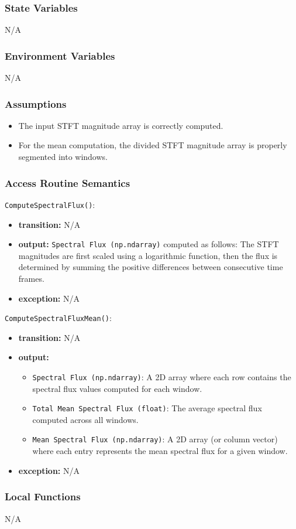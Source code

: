 \documentclass[12pt, titlepage]{article}
\begin{document}
{\subsubsection{State Variables}
N/A

\subsubsection{Environment Variables}
N/A

\subsubsection{Assumptions}
\begin{itemize}
    \item The input STFT magnitude array is correctly computed.
    \item For the mean computation, the divided STFT magnitude array is properly segmented into windows.
\end{itemize}

\subsubsection{Access Routine Semantics}

\noindent \texttt{ComputeSpectralFlux()}:
\begin{itemize}
    \item \textbf{transition:} N/A
    \item \textbf{output:} \texttt{Spectral Flux (np.ndarray)} computed as follows: The STFT magnitudes are first scaled using a logarithmic function, then the flux is determined by summing the positive differences between consecutive time frames.
    \item \textbf{exception:} N/A
\end{itemize}

\noindent \texttt{ComputeSpectralFluxMean()}:
\begin{itemize}
    \item \textbf{transition:} N/A
    \item \textbf{output:} 
    \begin{itemize}
        \item \texttt{Spectral Flux (np.ndarray)}: A 2D array where each row contains the spectral flux values computed for each window.
        \item \texttt{Total Mean Spectral Flux (float)}: The average spectral flux computed across all windows.
        \item \texttt{Mean Spectral Flux (np.ndarray)}: A 2D array (or column vector) where each entry represents the mean spectral flux for a given window.
    \end{itemize}
    \item \textbf{exception:} N/A
\end{itemize}

\subsubsection{Local Functions}
N/A
}
\end{document}
